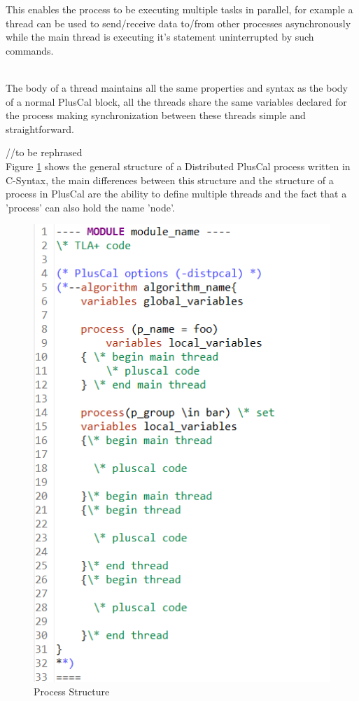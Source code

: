 \documentclass{thesul}
\begin{document}
This enables the process to be executing multiple tasks in parallel, for example a thread can be used to send/receive data to/from other processes asynchronously while the main thread is executing it's statement uninterrupted by such commands.

\hfill\\
The body of a thread maintains all the same properties and syntax as the body of a normal PlusCal block, all the threads share the same variables declared for the process making synchronization between these threads simple and straightforward.


//to be rephrased \hfill\\
Figure \ref{fig:process} shows the general structure of a Distributed PlusCal process written in C-Syntax, the main differences between this structure and the structure of a process in PlusCal are the ability to define multiple threads and the fact that a 'process' can also hold the name 'node'.


\begin{figure}[h!]
\centering
\includegraphics[scale=0.8]{ProcessStruct.png}
\caption{Process Structure}
\label{fig:process}
\end{figure}
\FloatBarrier
\end{document}
